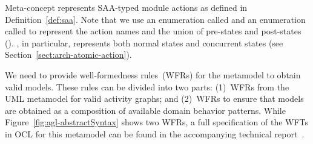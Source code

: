 Meta-concept  represents SAA-typed module actions as defined in Definition~\ref{def:saa}. Note that we use an enumeration called  and an enumeration called  to represent the action names and the union of pre-states and post-states (\resp). , in particular, represents both normal states and concurrent states (see Section~\ref{sect:arch-atomic-action}).

We need to provide well-formedness rules~(WFRs) for the metamodel to obtain valid \agl models. These rules can be divided into two parts: (1)~WFRs from the UML metamodel for valid activity graphs; and (2)~WFRs to ensure that \agl models are obtained as a composition of available domain behavior patterns. While Figure~\ref{fig:agl-abstractSyntax} shows two WFRs, a full specification of the WFTs in OCL for this metamodel can be found in the accompanying technical report~\cite{dang2023aglTechReport}.

